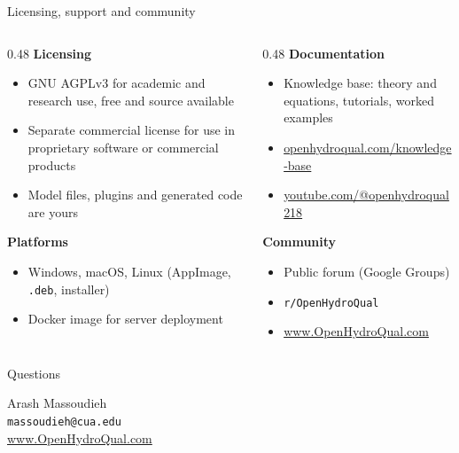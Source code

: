 \documentclass[aspectratio=169, 10pt]{beamer}
\begin{document}
\begin{frame}{Licensing, support and community}
  \begin{columns}[T,onlytextwidth]
    \begin{column}{0.48\textwidth}
      \textbf{Licensing}
      \begin{itemize}\setlength\itemsep{2pt}
        \item \alert{GNU AGPLv3} for academic and research use, free and
              source available
        \item Separate \alert{commercial license} for use in proprietary
              software or commercial products
        \item Model files, plugins and generated code are yours
      \end{itemize}
      \vspace{0.6em}
      \textbf{Platforms}
      \begin{itemize}\setlength\itemsep{2pt}
        \item Windows, macOS, Linux (AppImage, \texttt{.deb}, installer)
        \item Docker image for server deployment
      \end{itemize}
    \end{column}
    \begin{column}{0.48\textwidth}
      \textbf{Documentation}
      \begin{itemize}\setlength\itemsep{2pt}
        \item Knowledge base: theory and equations, tutorials, worked examples
        \item \url{openhydroqual.com/knowledge-base}
        \item \url{youtube.com/@openhydroqual218}
      \end{itemize}
      \vspace{0.6em}
      \textbf{Community}
      \begin{itemize}\setlength\itemsep{2pt}
        \item Public forum (Google Groups)
        \item \texttt{r/OpenHydroQual}
        \item \url{www.OpenHydroQual.com}
      \end{itemize}
    \end{column}
  \end{columns}
\end{frame}

\begin{frame}[standout]
  Questions
  \vspace{0.8em}

  {\normalsize
  Arash Massoudieh\\
  \texttt{massoudieh@cua.edu}\\
  \url{www.OpenHydroQual.com}}
\end{frame}
\end{document}
